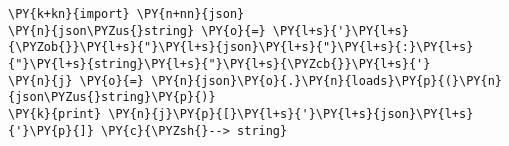 \begin{Verbatim}[commandchars=\\\{\}]
\PY{k+kn}{import} \PY{n+nn}{json}
\PY{n}{json\PYZus{}string} \PY{o}{=} \PY{l+s}{'}\PY{l+s}{\PYZob{}}\PY{l+s}{"}\PY{l+s}{json}\PY{l+s}{"}\PY{l+s}{:}\PY{l+s}{"}\PY{l+s}{string}\PY{l+s}{"}\PY{l+s}{\PYZcb{}}\PY{l+s}{'}
\PY{n}{j} \PY{o}{=} \PY{n}{json}\PY{o}{.}\PY{n}{loads}\PY{p}{(}\PY{n}{json\PYZus{}string}\PY{p}{)}
\PY{k}{print} \PY{n}{j}\PY{p}{[}\PY{l+s}{'}\PY{l+s}{json}\PY{l+s}{'}\PY{p}{]} \PY{c}{\PYZsh{}--> string}
\end{Verbatim}
